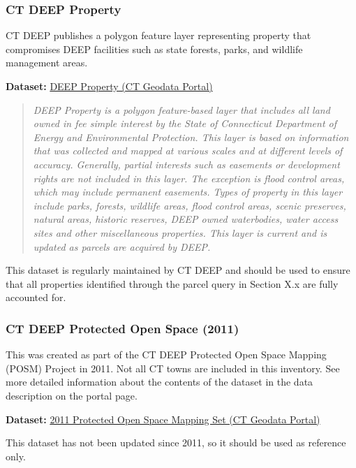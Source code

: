 \documentclass[
  letterpaper,
  DIV=11,
  numbers=noendperiod]{scrreprt}
\begin{document}
\subsubsection{CT DEEP Property}\label{sec-ct-deep-property}

CT DEEP publishes a polygon feature layer representing property that
compromises DEEP facilities such as state forests, parks, and wildlife
management areas.

\textbf{Dataset:}
\href{https://geodata.ct.gov/datasets/CTDEEP::deep-property-3/about}{DEEP
Property (CT Geodata Portal)}

\begin{quote}
\emph{DEEP Property is a polygon feature-based layer that includes all
land owned in fee simple interest by the State of Connecticut Department
of Energy and Environmental Protection. This layer is based on
information that was collected and mapped at various scales and at
different levels of accuracy. Generally, partial interests such as
easements or development rights are not included in this layer. The
exception is flood control areas, which may include permanent easements.
Types of property in this layer include parks, forests, wildlife areas,
flood control areas, scenic preserves, natural areas, historic reserves,
DEEP owned waterbodies, water access sites and other miscellaneous
properties. This layer is current and is updated as parcels are acquired
by DEEP.}
\end{quote}

This dataset is regularly maintained by CT DEEP and should be used to
ensure that all properties identified through the parcel query in
Section X.x are fully accounted for.

\subsubsection{CT DEEP Protected Open Space
(2011)}\label{sec-ct-deep-protected-open-space-2011}

This was created as part of the CT DEEP Protected Open Space Mapping
(POSM) Project in 2011. Not all CT towns are included in this inventory.
See more detailed information about the contents of the dataset in the
data description on the portal page.

\textbf{Dataset:}
\href{https://geodata.ct.gov/maps/80c5e61b6e86423d9089350785e709a3/about}{2011
Protected Open Space Mapping Set (CT Geodata Portal)}

This dataset has not been updated since 2011, so it should be used as
reference only.
\end{document}
